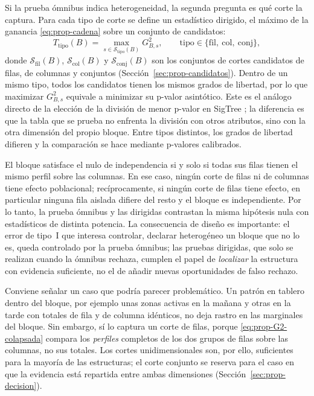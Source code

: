 Si la prueba ómnibus indica heterogeneidad, la segunda pregunta es qué corte la
captura. Para cada tipo de corte se define un estadístico dirigido, el máximo de
la ganancia \eqref{eq:prop-cadena} sobre un conjunto de candidatos:
\begin{equation}\label{eq:prop-dirigidos}
  T_{\mathrm{tipo}}(B) = \max_{s\in\mathcal{S}_{\mathrm{tipo}}(B)} G^2_{B,s},
  \qquad \mathrm{tipo}\in\{\mathrm{fil},\ \mathrm{col},\ \mathrm{conj}\},
\end{equation}
donde $\mathcal{S}_{\mathrm{fil}}(B)$, $\mathcal{S}_{\mathrm{col}}(B)$ y
$\mathcal{S}_{\mathrm{conj}}(B)$ son los conjuntos de cortes candidatos de filas,
de columnas y conjuntos (Sección~\ref{sec:prop-candidatos}).
Dentro de un mismo tipo, todos los candidatos tienen los mismos grados de
libertad, por lo que maximizar $G^2_{B,s}$ equivale a minimizar su p-valor
asintótico. Este es el análogo directo de la elección de la división de menor
p-valor en SigTree \cite{Hu2025}; la diferencia es que la tabla que se prueba
no enfrenta la división con otros atributos, sino con la otra dimensión del
propio bloque. Entre tipos distintos, los grados de libertad difieren y la
comparación se hace mediante p-valores calibrados.

\begin{observacion}\label{obs:nulo-comun}
El bloque satisface el nulo de independencia si y solo si todas sus filas tienen
el mismo perfil sobre las columnas. En ese caso, ningún corte de filas ni de
columnas tiene efecto poblacional; recíprocamente, si ningún corte de filas
tiene efecto, en particular ninguna fila aislada difiere del resto y el bloque
es independiente. Por lo tanto, la prueba ómnibus y las dirigidas contrastan la
misma hipótesis nula con estadísticos de distinta potencia. La consecuencia de
diseño es importante: el error de tipo~I que interesa controlar, declarar
heterogéneo un bloque que no lo es, queda controlado por la prueba ómnibus; las
pruebas dirigidas, que solo se realizan cuando la ómnibus rechaza, cumplen el
papel de \emph{localizar} la estructura con evidencia suficiente, no el de
añadir nuevas oportunidades de falso rechazo.
\end{observacion}

Conviene señalar un caso que podría parecer problemático. Un patrón en tablero
dentro del bloque, por ejemplo unas zonas activas en la mañana y otras en la
tarde con totales de fila y de columna idénticos, no deja rastro en las
marginales del bloque. Sin embargo, sí lo captura un corte de filas, porque
\eqref{eq:prop-G2-colapsada} compara los \emph{perfiles} completos de los dos
grupos de filas sobre las columnas, no sus totales. Los cortes unidimensionales
son, por ello, suficientes para la mayoría de las estructuras; el corte conjunto
se reserva para el caso en que la evidencia está repartida entre ambas
dimensiones (Sección~\ref{sec:prop-decision}).

